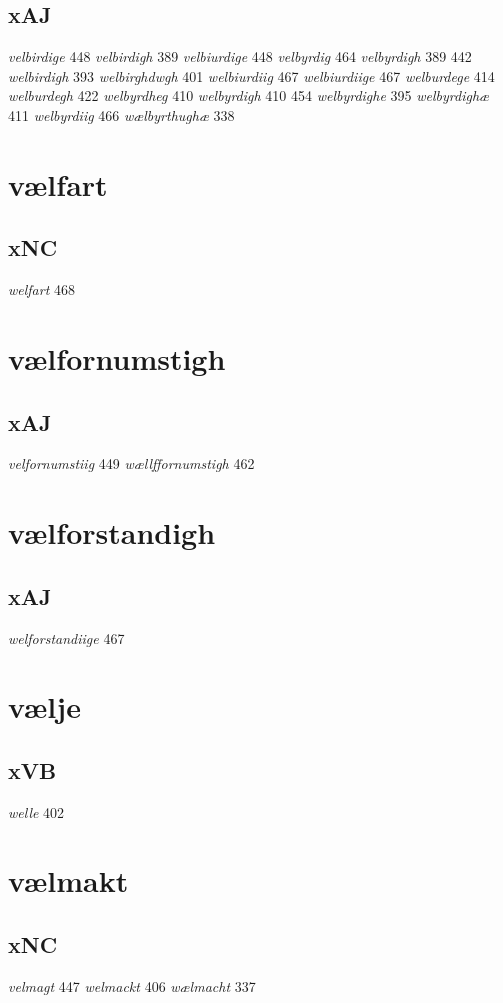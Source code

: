 \documentclass[a4paper,twocolumn]{article}
\begin{document}
\subsection{xAJ}
\label{sec:orgcf66628}
\emph{velbirdige} 448 \emph{velbirdigh} 389 \emph{velbiurdige} 448 \emph{velbyrdig} 464 \emph{velbyrdigh} 389 442 \emph{welbirdigh} 393 \emph{welbirghdwgh} 401 \emph{welbiurdiig} 467 \emph{welbiurdiige} 467 \emph{welburdege} 414 \emph{welburdegh} 422 \emph{welbyrdheg} 410 \emph{welbyrdigh} 410 454 \emph{welbyrdighe} 395 \emph{welbyrdighæ} 411 \emph{welbyrdiig} 466 \emph{wælbyrthughæ} 338 
\section{vælfart}
\label{sec:org003ca57}
\subsection{xNC}
\label{sec:org2b2002b}
\emph{welfart} 468 
\section{vælfornumstigh}
\label{sec:org1f1dacb}
\subsection{xAJ}
\label{sec:org888e4bf}
\emph{velfornumstiig} 449 \emph{wællffornumstigh} 462 
\section{vælforstandigh}
\label{sec:org8f6f8c9}
\subsection{xAJ}
\label{sec:org53f6994}
\emph{welforstandiige} 467 
\section{vælje}
\label{sec:org8cabd70}
\subsection{xVB}
\label{sec:org59cabe0}
\emph{welle} 402 
\section{vælmakt}
\label{sec:org3e516f0}
\subsection{xNC}
\label{sec:org1f95b71}
\emph{velmagt} 447 \emph{welmackt} 406 \emph{wælmacht} 337 
\end{document}
